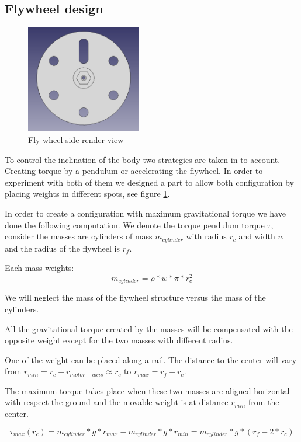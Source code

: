 \subsection{Flywheel design}
\begin{figure}
	\centering
	\includegraphics[width=5cm]{img/fly_wheel_side.png}
	\caption{Fly wheel side render view}
	\label{fig:Fly wheel side render view}
\end{figure}

To control the inclination of the body two strategies are taken in to account. Creating torque by a pendulum or accelerating the flywheel. In order to experiment with both of them we designed a part to allow both configuration by placing weights in different spots, see figure \ref{fig:Fly wheel side render view}.

In order to create a configuration with maximum gravitational torque we have done the following computation. We denote the torque pendulum torque $\tau$, consider the masses are cylinders of mass $m_{cylinder}$ with radius $r_c$ and width $w$ and the radius of the flywheel is $r_f$.

Each mass weights:
\[ m_{cylinder} = \rho * w * \pi * r_c^2 \]

We will neglect the mass of the flywheel structure versus the mass of the cylinders.

All the gravitational torque created by the masses will be compensated with the opposite weight except for the two masses with different radius.

One of the weight can be placed along a rail. The distance to the center will vary from $r_{min} = r_c + r_{motor-axis} \approx r_c $ to $r_{max} = r_f - r_c$. 

The maximum torque takes place when these two masses are aligned horizontal with respect the ground and the movable weight is at distance $r_{min}$ from the center.

\[ \tau _{max} (r_c) =  m_{cylinder} * g * r_{max} -  m_{cylinder} * g * r_{min} =  m_{cylinder}* g * (r_f - 2 * r_c) \]

